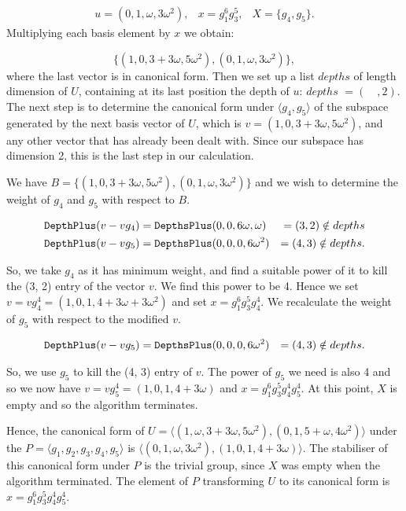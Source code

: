 \documentclass[12pt]{report}
\begin{document}
\begin{eqnarray*}
u = (0, 1, \omega, 3\omega^2), & x = g_1^6 g_3^5, & X = \{g_4, g_5\}.
\end{eqnarray*}
Multiplying each basis element by $x$ we obtain:

$$\{ (1, 0, 3 + 3 \omega, 5 \omega^2), (0, 1, \omega, 3\omega^2) \},$$
where the last vector is in canonical form. Then we set up a list $depths$ of length dimension of $U$, containing at its last position the depth of $u$: $depths$ $= (\quad, 2)$. The next step is to determine the canonical form under $\langle g_4, g_5 \rangle$ of the subspace generated by the next basis vector of $U$, which is $v = (1, 0, 3 + 3 \omega, 5 \omega^2)$, and any other vector that has already been dealt with. Since our subspace has dimension 2, this is the last step in our calculation.

We have $B = \{(1, 0, 3 + 3 \omega, 5 \omega^2), (0, 1, \omega, 3\omega^2) \}$ and we wish to determine the weight of $g_4$ and $g_5$ with respect to $B$.

\begin{eqnarray*}
{\tt DepthPlus}(v - v g_4) & = {\tt DepthsPlus}(0, 0, 6\omega, \omega) & = (3, 2) \notin depths \\
{\tt DepthPlus}(v - v g_5) & = {\tt DepthsPlus}(0, 0, 0, 6\omega^2) & = (4, 3) \notin depths.
\end{eqnarray*}

So, we take $g_4$ as it has minimum weight, and find a suitable power of it to kill the (3, 2) entry of the vector $v$. We find this power to be 4. Hence we set $v = vg_4^4 = (1, 0, 1, 4 + 3\omega + 3\omega^2)$ and set $x = g_1^6 g_3^5 g_4^4$. We recalculate the weight of $g_5$ with respect to the modified $v$.

\begin{eqnarray*}
{\tt DepthPlus}(v - v g_5) & = {\tt DepthsPlus}(0, 0, 0, 6\omega^2) & = (4, 3) \notin depths.
\end{eqnarray*}

So, we use $g_5$ to kill the (4, 3) entry of $v$. The power of $g_5$ we need is also 4 and so we now have $v = vg_5^4 = (1, 0, 1, 4 + 3\omega)$ and $x = g_1^6 g_3^5 g_4^4 g_5^4$. At this point, $X$ is empty and so the algorithm terminates.

Hence, the canonical form of $U = \langle (1, \omega, 3 + 3 \omega, 5 \omega^2), (0, 1, 5+\omega, 4\omega^2) \rangle$ under the $P = \langle g_1, g_2, g_3, g_4, g_5 \rangle$ is $\langle (0, 1, \omega, 3\omega^2), (1, 0, 1, 4 + 3\omega) \rangle$. The stabiliser of this canonical form under $P$ is the trivial group, since $X$ was empty when the algorithm terminated. The element of $P$ transforming $U$ to its canonical form is $x = g_1^6 g_3^5 g_4^4 g_5^4$.
\end{document}
